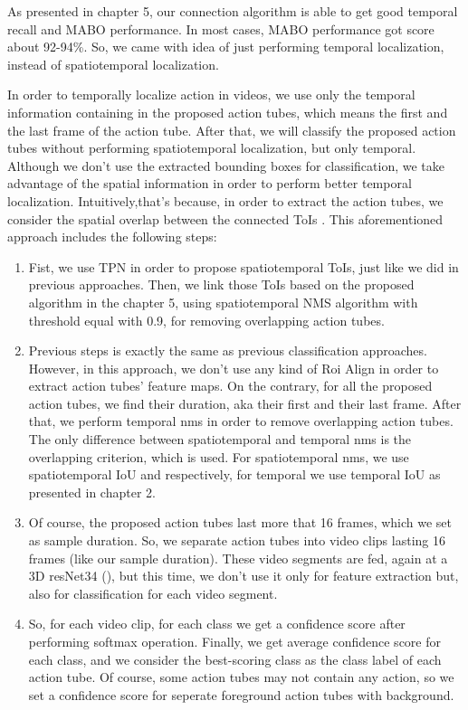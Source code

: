 As presented in chapter 5, our connection algorithm is able to get good temporal recall and MABO performance. In most cases, MABO performance
got score about 92-94\%. So, we came with idea of just performing temporal localization, instead of spatiotemporal localization. \par
In order to temporally localize action in videos, we use only the temporal information containing in the proposed action tubes, which means the first and the last frame of the action tube.
After that, we will classify the proposed action tubes without performing spatiotemporal localization, but only temporal. Although we don't use the extracted bounding boxes for classification, we take advantage of the spatial information in order to perform better temporal localization. Intuitively,that's because, in order to extract the action tubes, we consider the spatial overlap between the connected ToIs . This aforementioned approach includes the following steps:
\begin{enumerate}
\item Fist, we use TPN in order to propose  spatiotemporal ToIs, just like we did in previous approaches. Then, we link those ToIs based
  on the proposed algorithm in the chapter 5, using spatiotemporal NMS algorithm with threshold equal with 0.9, for removing overlapping action tubes.
\item Previous steps is exactly the same as previous classification approaches. However, in this approach, we don't use any kind of Roi Align
  in order to extract action tubes' feature maps. On the contrary, for all the proposed action tubes, we find their duration, aka their first
  and their last frame. After that, we perform temporal nms in order to remove overlapping action tubes. The only difference between
  spatiotemporal and temporal nms is the overlapping criterion, which is used. For spatiotemporal nms, we use spatiotemporal IoU and
  respectively, for temporal we use temporal IoU as presented in chapter 2.
\item Of course, the proposed action tubes last more that 16 frames, which we set as sample duration. So, we separate action tubes into
  video clips lasting 16 frames (like our sample duration). These video segments are fed, again at a 3D resNet34 (\cite{hara3dcnns}),
  but this time, we don't use it only for feature extraction but, also for classification for each video segment.
\item So, for each video clip, for each class we get a confidence score after performing softmax operation. Finally, we get
  average confidence score for each class, and we consider the best-scoring class as the class label of each action tube.
  Of course, some action tubes may not contain any action, so we set a confidence score for seperate foreground action tubes with
  background.
\end{enumerate}

